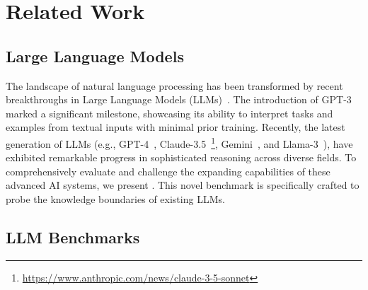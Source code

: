 \section{Related Work}

\subsection{Large Language Models}

The landscape of natural language processing has been transformed by recent breakthroughs in Large Language Models (LLMs)~\citep{zhang2024mapneo,Young2024YiOF}. The introduction of GPT-3 marked a significant milestone, showcasing its ability to interpret tasks and examples from textual inputs with minimal prior training. 
Recently, the latest generation of LLMs (e.g., GPT-4~\citep{gpt4}, Claude-3.5~\footnote{\url{https://www.anthropic.com/news/claude-3-5-sonnet}}, Gemini~\citep{gemini1}, and Llama-3~\citep{llama3modelcard}), have exhibited remarkable progress in sophisticated reasoning across diverse fields.
To comprehensively evaluate and challenge the expanding capabilities of these advanced AI systems, we present \benchmark. This novel benchmark is specifically crafted to probe the knowledge boundaries of existing LLMs.


\subsection{LLM Benchmarks}


